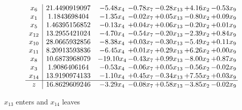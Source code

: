 \documentclass[9pt]{article}
\begin{document}
 \[\begin{array}{c| c c@{\hskip 2pt} c@{\hskip 2pt} c@{\hskip 2pt} c@{\hskip 2pt} c@{\hskip 2pt} }
 x_{6}   &  21.4490919097 & -5.48 x_{4} & -0.78 x_{7} & -0.28 x_{13} & +  4.16 x_{2} & -0.53 x_{9}\\
 x_{1}   &  1.1843698404 & -1.35 x_{4} & -0.02 x_{7} & +  0.05 x_{13} & -0.80 x_{2} & +  0.09 x_{9}\\
 x_{5}   &  1.46395156852 & -0.13 x_{4} & +  0.04 x_{7} & +  0.06 x_{13} & -0.20 x_{2} & +  0.01 x_{9}\\
 x_{12}   &  13.2955421024 & -4.70 x_{4} & -0.54 x_{7} & -0.20 x_{13} & -2.39 x_{2} & +  0.84 x_{9}\\
 x_{10}   &  28.0665932856 & -8.38 x_{4} & +  0.03 x_{7} & -0.30 x_{13} & -5.49 x_{2} & +  0.11 x_{9}\\
 x_{11}   &  8.20913593836 & -6.45 x_{4} & +  0.01 x_{7} & +  0.29 x_{13} & +  6.26 x_{2} & +  0.00 x_{9}\\
 x_{8}   &  10.6873968079 & -19.10 x_{4} & -0.43 x_{7} & +  0.99 x_{13} & -8.00 x_{2} & +  0.87 x_{9}\\
 x_{3}   &  1.9086406164 & -0.53 x_{4} & -0.06 x_{7} & +  0.05 x_{13} & -0.56 x_{2} & -0.02 x_{9}\\
 x_{14}   &  13.9190974133 & -1.10 x_{4} & +  0.45 x_{7} & -0.34 x_{13} & +  7.55 x_{2} & +  0.03 x_{9}\\
\hline
z    &  16.8629609246 & -3.29 x_{4} & -0.08 x_{7} & +  0.58 x_{13} & -3.85 x_{2} & -0.02 x_{9}\\
\end{array}\]


 $ x_{13} $ enters and $ x_{14} $ leaves 
\end{document}
